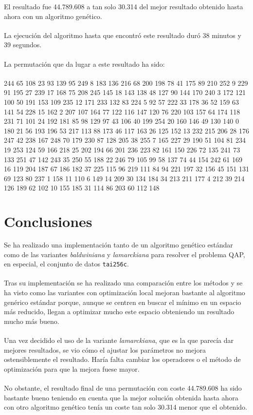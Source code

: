 El resultado fue 44.789.608 a tan solo 30.314 del mejor resultado obtenido hasta ahora con un algoritmo genético.
\\ \\
La ejecución del algoritmo hasta que encontró este resultado duró 38 minutos y 39 segundos.
\\ \\
La permutación que da lugar a este resultado ha sido: 
\\ \\
244 65 108 23 93 139 95 249 8 183 136 216 68 200 198 78 41 175 89 210 252 9 229 91 195 27 239 17 168 75 208 245 145 18 143 138 48 127 90 144 170 240 3 172 121 100 50 191 153 109 235 12 171 233 132 83 224 5 92 57 222 33 178 36 52 159 63 141 54 228 15 162 2 207 107 164 77 122 116 147 120 76 220 103 157 64 174 118 231 71 101 24 192 181 85 98 129 97 43 106 40 199 254 20 160 146 49 130 140 0 180 21 56 193 196 53 217 113 88 173 46 117 163 26 125 152 13 232 215 206 28 176 247 42 238 167 248 70 179 230 87 128 205 38 255 7 165 227 29 190 51 104 81 234 19 253 124 59 166 218 25 202 194 66 201 236 223 82 161 150 226 72 135 241 73 133 251 47 142 243 35 250 55 188 22 246 79 105 99 58 137 74 44 154 242 61 169 16 119 204 187 67 186 182 37 225 115 96 219 111 84 94 221 197 32 156 45 151 131 69 123 80 237 1 158 11 110 6 149 14 209 30 134 184 34 213 211 177 4 212 39 214 126 189 62 102 10 155 185 31 114 86 203 60 112 148

\section{Conclusiones}

Se ha realizado una implementación tanto de un algoritmo genético estándar como de las variantes \textit{baldwiniana} y \textit{lamarckiana} para resolver el problema QAP, en especial, el conjunto de datos \texttt{tai256c}.
\\ \\
Tras su implementación se ha realizado una comparación entre los métodos y se ha visto como las variantes con optimización local mejoran bastante al algoritmo genérico estándar porque, aunque se centren en buscar el mínimo en un espacio más reducido, llegan a optimizar mucho este espacio obteniendo un resultado mucho más bueno.
\\ \\
Una vez decidido el uso de la variante \textit{lamarckiana}, que es la que parecía dar mejores resultados, se vio cómo el ajustar los parámetros no mejora ostensiblemente el resultado. Haría falta cambiar los operadores o el método de optimización para que la mejora fuese mayor.
\\ \\
No obstante, el resultado final de una permutación con coste 44.789.608 ha sido bastante bueno teniendo en cuenta que la mejor solución obtenida hasta ahora con otro algoritmo genético tenía un coste tan solo 30.314 menor que el obtenido.


